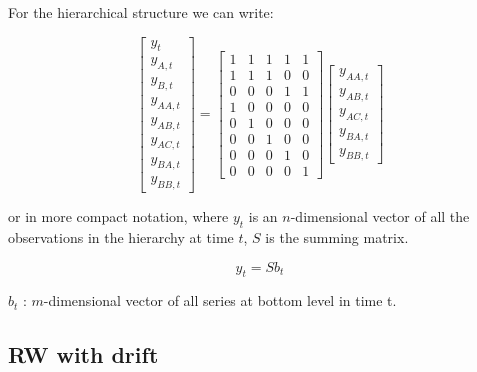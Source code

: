 \documentclass[c, dvipsnames]{beamer}  %
\begin{document}
\begin{frame}[shrink=5]
\frametitle{\insertsection} 
\framesubtitle{\insertsubsection}


For the hierarchical structure we can write: 

\[\begin{bmatrix}
y_{t} \\
y_{A, t} \\
y_{B, t} \\
y_{AA, t} \\
y_{AB, t} \\
y_{AC, t} \\
y_{BA, t} \\
y_{BB, t}
\end{bmatrix}
=
\begin{bmatrix}
1 & 1 & 1 & 1 & 1 \\
1 & 1 & 1 & 0 & 0 \\
0 & 0 & 0 & 1 & 1 \\
1  & 0  & 0  & 0  & 0  \\
0  & 1  & 0  & 0  & 0  \\
0  & 0  & 1  & 0  & 0  \\
0  & 0  & 0  & 1  & 0  \\
0  & 0  & 0  & 0  & 1
\end{bmatrix}
\begin{bmatrix}
y_{AA, t} \\
y_{AB, t} \\
y_{AC, t} \\
y_{BA, t} \\
y_{BB, t}
\end{bmatrix}\]


or in more compact notation,  where  $y_t$   is an $n$-dimensional vector of all the observations in the hierarchy at time $t$, $S$  is the summing matrix.

$$y_t  = S b_t$$


$ b_t $ : $m$-dimensional vector of all series at
bottom level in time t.


\end{frame}






\subsection{RW with drift}
\end{document}
